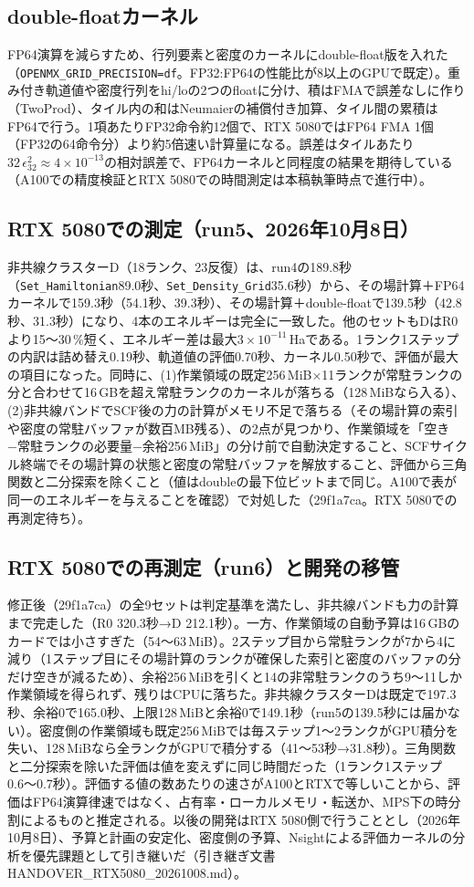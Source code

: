 \documentclass[a4paper,11pt]{ltjsarticle}
\newcommand{\code}[1]{\texttt{#1}}
\newcommand{\E}[1]{\times10^{#1}}
\begin{document}
\subsection{double-floatカーネル}
FP64演算を減らすため、行列要素と密度のカーネルにdouble-float版を入れた（\code{OPENMX\_GRID\_PRECISION=df}。FP32:FP64の性能比が8以上のGPUで既定）。重み付き軌道値や密度行列をhi/loの2つのfloatに分け、積はFMAで誤差なしに作り（TwoProd）、タイル内の和はNeumaierの補償付き加算、タイル間の累積はFP64で行う。1項あたりFP32命令約12個で、RTX 5080ではFP64 FMA 1個（FP32の64命令分）より約5倍速い計算量になる。誤差はタイルあたり$32\,\epsilon_{32}^2\approx4\E{-13}$の相対誤差で、FP64カーネルと同程度の結果を期待している（A100での精度検証とRTX 5080での時間測定は本稿執筆時点で進行中）。
\subsection{RTX 5080での測定（run5、2026年10月8日）}
非共線クラスターD（18ランク、23反復）は、run4の189.8秒（\code{Set\_Hamiltonian}89.0秒、\code{Set\_Density\_Grid}35.6秒）から、その場計算＋FP64カーネルで159.3秒（54.1秒、39.3秒）、その場計算＋double-floatで139.5秒（42.8秒、31.3秒）になり、4本のエネルギーは完全に一致した。他のセットもDはR0より15〜30\,\%短く、エネルギー差は最大$3\E{-11}$\,Haである。1ランク1ステップの内訳は詰め替え0.19秒、軌道値の評価0.70秒、カーネル0.50秒で、評価が最大の項目になった。同時に、(1)作業領域の既定256\,MiB×11ランクが常駐ランクの分と合わせて16\,GBを超え常駐ランクのカーネルが落ちる（128\,MiBなら入る）、(2)非共線バンドでSCF後の力の計算がメモリ不足で落ちる（その場計算の索引や密度の常駐バッファが数百MB残る）、の2点が見つかり、作業領域を「空き−常駐ランクの必要量−余裕256\,MiB」の分け前で自動決定すること、SCFサイクル終端でその場計算の状態と密度の常駐バッファを解放すること、評価から三角関数と二分探索を除くこと（値はdoubleの最下位ビットまで同じ。A100で表が同一のエネルギーを与えることを確認）で対処した（29f1a7ca。RTX 5080での再測定待ち）。

\subsection{RTX 5080での再測定（run6）と開発の移管}
修正後（29f1a7ca）の全9セットは判定基準を満たし、非共線バンドも力の計算まで完走した（R0 320.3秒→D 212.1秒）。一方、作業領域の自動予算は16\,GBのカードでは小さすぎた（54〜63\,MiB）。2ステップ目から常駐ランクが7から4に減り（1ステップ目にその場計算のランクが確保した索引と密度のバッファの分だけ空きが減るため）、余裕256\,MiBを引くと14の非常駐ランクのうち9〜11しか作業領域を得られず、残りはCPUに落ちた。非共線クラスターDは既定で197.3秒、余裕0で165.0秒、上限128\,MiBと余裕0で149.1秒（run5の139.5秒には届かない）。密度側の作業領域も既定256\,MiBでは毎ステップ1〜2ランクがGPU積分を失い、128\,MiBなら全ランクがGPUで積分する（41〜53秒→31.8秒）。三角関数と二分探索を除いた評価は値を変えずに同じ時間だった（1ランク1ステップ0.6〜0.7秒）。評価する値の数あたりの速さがA100とRTXで等しいことから、評価はFP64演算律速ではなく、占有率・ローカルメモリ・転送か、MPS下の時分割によるものと推定される。以後の開発はRTX 5080側で行うこととし（2026年10月8日）、予算と計画の安定化、密度側の予算、Nsightによる評価カーネルの分析を優先課題として引き継いだ（引き継ぎ文書 HANDOVER\_RTX5080\_20261008.md）。
\end{document}
